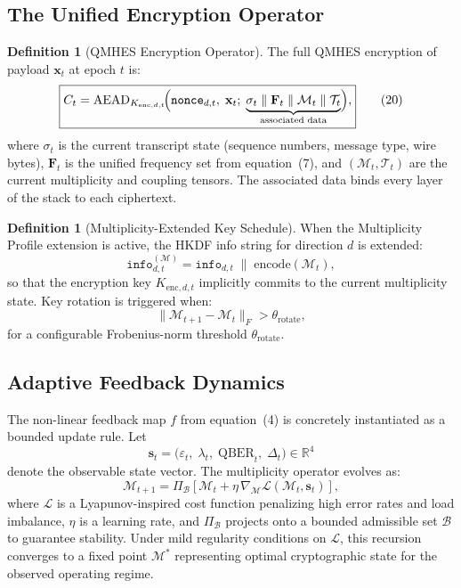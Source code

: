 \documentclass[12pt,letterpaper]{article}
\theoremstyle{plain}
\theoremstyle{definition}
\newtheorem{definition}[theorem]{Definition}
\begin{document}
\subsection{The Unified Encryption Operator}

\begin{definition}[QMHES Encryption Operator]
The full QMHES encryption of payload $\mathbf{x}_t$ at epoch $t$ is:
\[
  \boxed{
  C_t = \mathrm{AEAD}_{K_{\mathrm{enc},d,t}}\!\Bigl(
    \mathtt{nonce}_{d,t},\;
    \mathbf{x}_t;\;
    \underbrace{\sigma_t \;\|\; \mathbf{F}_t \;\|\; \mathcal{M}_t \;\|\;
      \mathcal{T}_t}_{\text{associated data}}
  \Bigr),
  }  \tag{20}
\]
where $\sigma_t$ is the current transcript state (sequence numbers, message
type, wire bytes), $\mathbf{F}_t$ is the unified frequency set from
equation~(7), and $(\mathcal{M}_t, \mathcal{T}_t)$ are the current multiplicity
and coupling tensors. The associated data binds every layer of the stack to
each ciphertext.
\end{definition}

\begin{definition}[Multiplicity-Extended Key Schedule]
When the Multiplicity Profile extension is active, the HKDF info string for
direction $d$ is extended:
\[
  \mathtt{info}_{d,t}^{(\mathcal{M})}
    = \mathtt{info}_{d,t} \;\|\; \mathrm{encode}(\mathcal{M}_t),  \tag{21}
\]
so that the encryption key $K_{\mathrm{enc},d,t}$ implicitly commits to the
current multiplicity state. Key rotation is triggered when:
\[
  \|\mathcal{M}_{t+1} - \mathcal{M}_t\|_F > \theta_{\mathrm{rotate}},  \tag{22}
\]
for a configurable Frobenius-norm threshold $\theta_{\mathrm{rotate}}$.
\end{definition}

\subsection{Adaptive Feedback Dynamics}

The non-linear feedback map $f$ from equation~(4) is concretely instantiated
as a bounded update rule. Let
\[
  \mathbf{s}_t = \bigl(\varepsilon_t,\; \lambda_t,\; \mathrm{QBER}_t,\;
    \Delta_t\bigr) \in \mathbb{R}^4  \tag{23}
\]
denote the observable state vector. The multiplicity operator evolves as:
\[
  \mathcal{M}_{t+1} = \Pi_{\mathcal{B}}\!\left[
    \mathcal{M}_t + \eta\, \nabla_{\!\mathcal{M}} \mathcal{L}(\mathcal{M}_t,
      \mathbf{s}_t)
  \right],  \tag{24}
\]
where $\mathcal{L}$ is a Lyapunov-inspired cost function penalizing high error
rates and load imbalance, $\eta$ is a learning rate, and $\Pi_{\mathcal{B}}$
projects onto a bounded admissible set $\mathcal{B}$ to guarantee stability.
Under mild regularity conditions on $\mathcal{L}$, this recursion converges to
a fixed point $\mathcal{M}^*$ representing optimal cryptographic state for the
observed operating regime.
\end{document}
